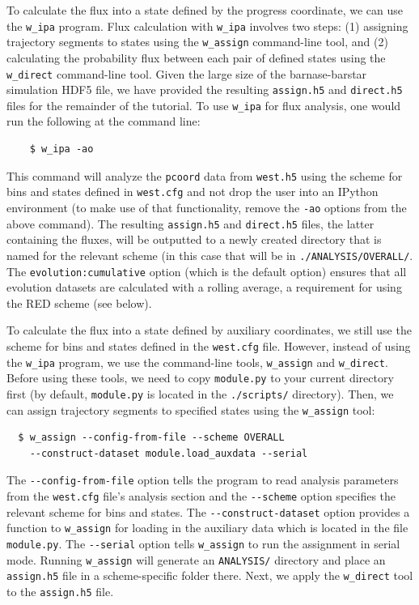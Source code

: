 To calculate the flux into a state defined by the progress coordinate, we can use the \verb|w_ipa| program. Flux calculation with \verb|w_ipa| involves two steps: (1) assigning trajectory segments to states using the \verb|w_assign| command-line tool, and (2) calculating the probability flux between each pair of defined states using the \verb|w_direct| command-line tool.
Given the large size of the barnase-barstar simulation HDF5 file, we have provided the resulting \verb|assign.h5| and \verb|direct.h5| files for the remainder of the tutorial.
To use \verb|w_ipa| for flux analysis, one would run the following at the command line:  

\begin{verbatim}
    $ w_ipa -ao
\end{verbatim}

This command will analyze the \verb|pcoord| data from \verb|west.h5| using the scheme for bins and states defined in \verb|west.cfg| and not drop the user into an IPython environment (to make use of that functionality, remove the \verb|-ao| options from the above command).
The resulting \verb|assign.h5| and \verb|direct.h5| files, the latter containing the fluxes, will be outputted to a newly created directory that is named for the relevant scheme (in this case that will be in \verb|./ANALYSIS/OVERALL/|.
The \verb|evolution:cumulative| option (which is the default option) ensures that all evolution datasets are calculated with a rolling average, a requirement for using the RED scheme (see below). 

To calculate the flux into a state defined by auxiliary coordinates, we still use the scheme for bins and states defined in the \verb|west.cfg| file.
However, instead of using the \verb|w_ipa| program, we use the command-line tools, \verb|w_assign| and \verb|w_direct|.
Before using these tools, we need to copy \verb|module.py| to your current directory first (by default, \verb|module.py| is located in the \verb|./scripts/| directory).
Then, we can assign trajectory segments to specified states using the \verb|w_assign| tool:

\begin{verbatim}
  $ w_assign --config-from-file --scheme OVERALL 
    --construct-dataset module.load_auxdata --serial
\end{verbatim}

The \verb|--config-from-file| option tells the program to read analysis parameters from the \verb|west.cfg| file’s analysis section and the \verb|--scheme| option specifies the relevant scheme for bins and states.
The \verb|--construct-dataset| option provides a function to \verb|w_assign| for loading in the auxiliary data which is located in the file \verb|module.py|.
The \verb|--serial| option tells \verb|w_assign| to run the assignment in serial mode.
Running \verb|w_assign| will generate an \verb|ANALYSIS/| directory and place an \verb|assign.h5| file in a scheme-specific folder there.
Next, we apply the \verb|w_direct| tool to the \verb|assign.h5| file.

